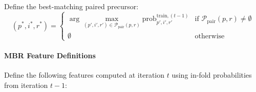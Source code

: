 \documentclass[pdflatex,sn-nature]{sn-jnl}
\begin{document}
Define the best-matching paired precursor:
\begin{equation}
(p^*, i^*, r^*) = \begin{cases}
  \displaystyle\arg\max_{(p',i',r') \in \mathcal{P}_{\text{pair}}(p,r)} \text{prob}_{p',i',r'}^{\text{train},(t-1)} & \text{if } \mathcal{P}_{\text{pair}}(p,r) \neq \emptyset \\
  \emptyset & \text{otherwise}
\end{cases}
\end{equation}

\paragraph{MBR Feature Definitions} Define the following features computed at iteration $t$ using in-fold probabilities from iteration $t-1$:
\end{document}
